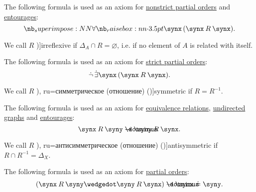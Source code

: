 \begin{definition}
\begin{thmenum}[resume=def:binary_relation]
    The following formula is used as an axiom for \hyperref[def:strict_partial_order]{nonstrict partial orders} and \hyperref[def:entourage]{entourages}:
    \begin{equation}\label{eq:def:binary_relation/reflexive}
      \qforall \synx (\synx \mathbin{R} \synx).
    \end{equation}

     We call \( R \) \term[ru=антирефлексивное (отношение) (\cite[def. 2.7]{Гуров2013ТеорияРешёток})]{irreflexive} if \( \Delta_A \cap R = \varnothing \), i.e. if no element of \( A \) is related with itself.

    The following formula is used as an axiom for \hyperref[def:strict_partial_order]{strict partial orders}:
    \begin{equation}\label{eq:def:binary_relation/irreflexive}
      \synneg \qexists \synx (\synx \mathbin{R} \synx).
    \end{equation}

     We call \( R \) \term[bg=симетрична (релация) (\cite[369]{ГеновМиховскиМоллов1991Алгебра}), ru=симметрическое (отношение) (\cite[def. 2.7]{Гуров2013ТеорияРешёток})]{symmetric} if \( R = R^{-1} \).

    The following formula is used as an axiom for \hyperref[def:equivalence_relation]{equivalence relations}, \hyperref[def:hypergraph/multigraph]{undirected graphs} and \hyperref[def:entourage]{entourages}:
    \begin{equation}\label{eq:def:binary_relation/symmetric}
      \synx \mathbin{R} \syny \synimplies \syny \mathbin{R} \synx.
    \end{equation}

     We call \( R \) \term[bg=антисиметрична (релация) (\cite[369]{ГеновМиховскиМоллов1991Алгебра}), ru=антисимметрическое (отношение) (\cite[def. 2.7]{Гуров2013ТеорияРешёток})]{antisymmetric} if \( R \cap R^{-1} = \Delta_X \).

    The following formula is used as an axiom for \hyperref[def:partially_ordered_set]{partial orders}:
    \begin{equation}\label{eq:def:binary_relation/antisymmetric}
      (\synx \mathbin{R} \syny \synwedge \syny \mathbin{R} \synx) \synimplies \synx \syneq \syny.
    \end{equation}


\end{thmenum}
\end{definition}
